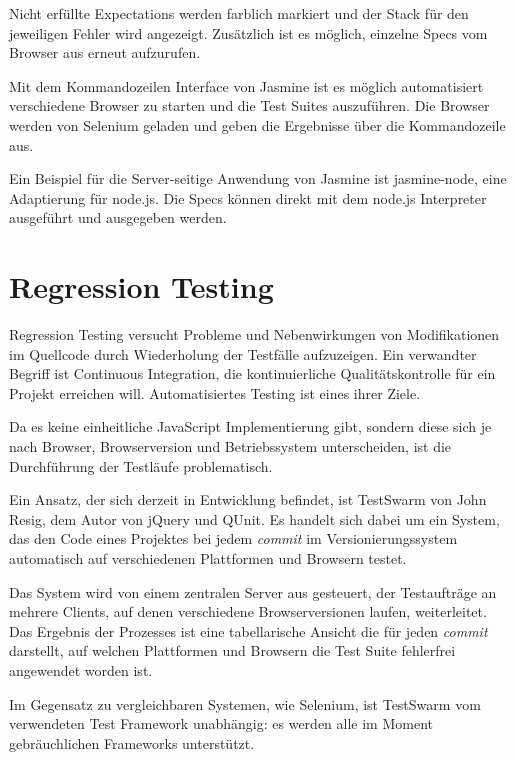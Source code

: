 \documentclass[11pt, a4paper]{article}
\begin{document}
Nicht erfüllte Expectations werden farblich markiert und der Stack für den
jeweiligen Fehler wird angezeigt. Zusätzlich ist es möglich, einzelne Specs vom
Browser aus erneut aufzurufen.

Mit dem Kommandozeilen Interface von Jasmine ist es möglich automatisiert
verschiedene Browser zu starten und die Test Suites auszuführen. Die Browser
werden von Selenium\cite{selenium_selenium_2011} geladen und geben die
Ergebnisse über die Kommandozeile aus.

Ein Beispiel für die Server-seitige Anwendung von Jasmine ist
jasmine-node\cite{hevery_jasmine-node_2011}, eine Adaptierung für node.js. Die
Specs können direkt mit dem node.js Interpreter ausgeführt und ausgegeben
werden.

\section{Regression Testing}

Regression Testing\cite{wikipedia_regression_2011} versucht Probleme und
Nebenwirkungen von Modifikationen im Quellcode durch Wiederholung der Testfälle
aufzuzeigen. Ein verwandter Begriff ist Continuous
Integration\cite{wikipedia_continuous_2011}, die kontinuierliche
Qualitätskontrolle für ein Projekt erreichen will. Automatisiertes Testing ist
eines ihrer Ziele. 

Da es keine einheitliche JavaScript Implementierung gibt, sondern
diese sich je nach Browser, Browserversion und Betriebssystem unterscheiden, ist
die Durchführung der Testläufe problematisch.

Ein Ansatz, der sich derzeit in Entwicklung befindet, ist
TestSwarm\cite{resig_testswarm_2011} von John Resig, dem Autor von jQuery und
QUnit. Es handelt sich dabei um ein System, das den Code eines Projektes bei
jedem \emph{commit} im Versionierungssystem automatisch auf verschiedenen
Plattformen und Browsern testet.

Das System wird von einem zentralen Server aus gesteuert, der Testaufträge an
mehrere Clients, auf denen verschiedene Browserversionen laufen, weiterleitet.
Das Ergebnis der Prozesses ist eine tabellarische Ansicht die für jeden
\emph{commit} darstellt, auf welchen Plattformen und Browsern die Test Suite
fehlerfrei angewendet worden ist.

Im Gegensatz zu vergleichbaren Systemen, wie
Selenium\cite{selenium_selenium_2011}, ist TestSwarm vom verwendeten Test
Framework unabhängig: es werden alle im Moment gebräuchlichen Frameworks
unterstützt.

\clearpage

\begin{flushleft}
  
  
\end{flushleft}
\end{document}
